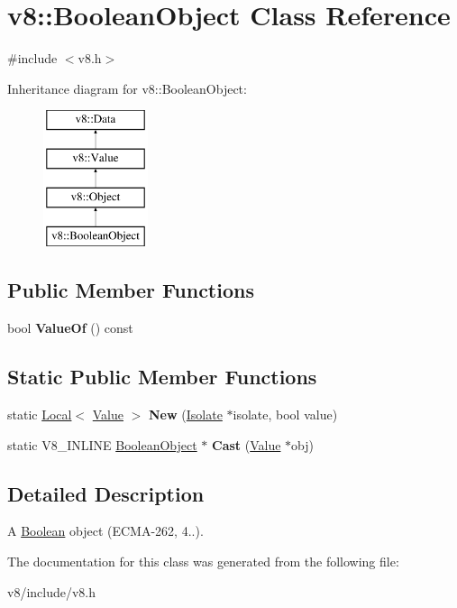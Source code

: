 \hypertarget{classv8_1_1BooleanObject}{}\section{v8\+:\+:Boolean\+Object Class Reference}
\label{classv8_1_1BooleanObject}


{\ttfamily \#include $<$v8.\+h$>$}

Inheritance diagram for v8\+:\+:Boolean\+Object\+:\begin{figure}[H]
\begin{center}
\leavevmode
\includegraphics[height=4.000000cm]{classv8_1_1BooleanObject}
\end{center}
\end{figure}
\subsection*{Public Member Functions}
\begin{DoxyCompactItemize}
\item 
\mbox{\label{classv8_1_1BooleanObject_a4f2f60a73ce9a730dd43046672b7b58b}} 
bool {\bfseries Value\+Of} () const
\end{DoxyCompactItemize}
\subsection*{Static Public Member Functions}
\begin{DoxyCompactItemize}
\item 
\mbox{\label{classv8_1_1BooleanObject_aaf29c0574a8366453ddb5a3d4f178ca4}} 
static \mbox{\hyperlink{classv8_1_1Local}{Local}}$<$ \mbox{\hyperlink{classv8_1_1Value}{Value}} $>$ {\bfseries New} (\mbox{\hyperlink{classv8_1_1Isolate}{Isolate}} $\ast$isolate, bool value)
\item 
\mbox{\label{classv8_1_1BooleanObject_a30b2a406f4dd98660c9b8f6030b3f914}} 
static V8\+\_\+\+I\+N\+L\+I\+NE \mbox{\hyperlink{classv8_1_1BooleanObject}{Boolean\+Object}} $\ast$ {\bfseries Cast} (\mbox{\hyperlink{classv8_1_1Value}{Value}} $\ast$obj)
\end{DoxyCompactItemize}


\subsection{Detailed Description}
A \mbox{\hyperlink{classv8_1_1Boolean}{Boolean}} object (E\+C\+M\+A-\/262, 4..). 

The documentation for this class was generated from the following file\+:\begin{DoxyCompactItemize}
\item 
v8/include/v8.\+h\end{DoxyCompactItemize}

